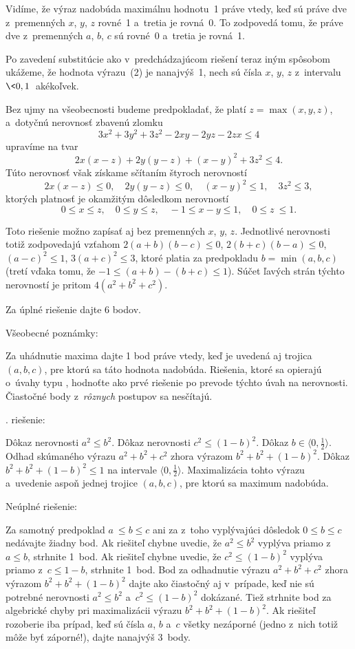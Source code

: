 {Vidíme, že výraz nadobúda maximálnu hodnotu~1
práve vtedy, keď sú práve dve z~premenných $x$, $y$, $z$ rovné~1
a~tretia je rovná~0. To zodpovedá tomu, že práve dve z~premenných $a$, $b$, $c$
sú rovné~0 a~tretia je rovná~1.

\ineres
Po zavedení substitúcie ako v~predchádzajúcom riešení teraz iným
spôsobom ukážeme, že hodnota výrazu~(2) je nanajvýš~1, nech sú čísla
$x$, $y$, $z$ z~intervalu $\<0,1\>$ akékoľvek.

Bez ujmy na všeobecnosti budeme predpokladať, že platí $z=\max(x,y,z)$,
a~dotyčnú nerovnosť zbavenú zlomku
$$
3x^2+3y^2+3z^2-2xy-2yz-2zx\le4
$$
upravíme na tvar
$$
2x(x-z)+2y(y-z)+(x-y)^2+3z^2\le4.
$$
Túto nerovnosť však získame sčítaním štyroch nerovností
$$
2x(x-z)\le0,\quad 2y(y-z)\le0,\quad (x-y)^2\le1,\quad 3z^2\le3,
$$
ktorých platnosť je okamžitým dôsledkom nerovností
$$
0\le x\le z,\quad 0\le y\le z,\quad -1\le x-y\le 1, \quad 0\le z~\le1.
$$

\poznamka
Toto riešenie možno zapísať aj bez premenných $x$, $y$, $z$.
Jednotlivé nerovnosti totiž zodpovedajú vzťahom
$2(a+b)(b-c)\le0$,
$2(b+c)(b-a)\le0$,
$(a-c)^2 \le1$,
$3(a+c)^2 \le3$,
ktoré platia za predpokladu $b=\min(a,b,c)$ (tretí vďaka tomu, že ${-1}\le (a+b)-(b+c)\le 1$).
Súčet ľavých strán týchto nerovností je pritom $4(a^2+b^2+c^2)$.

\nobreak\medskip\petit
\BeginSchema

Za úplné riešenie dajte 6 bodov.

\Podnadpis Všeobecné poznámky:

\Item Za uhádnutie maxima dajte 1 bod práve vtedy, keď je
uvedená aj trojica $(a, b, c)$, pre ktorú sa táto hodnota nadobúda.
\Item Riešenia, ktoré sa opierajú o~úvahy typu , hodnoťte ako prvé
riešenie po prevode týchto úvah na nerovnosti.
\Item Čiastočné body z~{\it rôznych\/} postupov sa nesčítajú.

. riešenie:

 Dôkaz nerovnosti $a^2 \le b^2$.
 Dôkaz nerovnosti $c^2 \le (1-b)^2$.
 Dôkaz $b \in \langle 0, \frac12 \rangle$.
 Odhad skúmaného výrazu $a^2+b^2+c^2$ zhora výrazom $b^2+b^2+(1-b)^2$.
 Dôkaz $b^2+b^2+(1-b)^2 \leq 1$ na intervale $\langle 0,\frac12 \rangle$.
 Maximalizácia tohto výrazu a~uvedenie aspoň jednej
trojice $(a, b, c)$, pre ktorú sa maximum nadobúda.

\Podnadpis Neúplné riešenie:

\Item Za samotný predpoklad $a~\le b \le c$ ani za z~toho vyplývajúci dôsledok $0\le b\le c$
nedávajte žiadny bod.
\Item Ak riešiteľ chybne uvedie, že $a^2 \le b^2$ vyplýva priamo z~$a\le b$, strhnite 1~bod.
\Item Ak riešiteľ chybne uvedie, že $c^2 \le (1-b)^2$ vyplýva priamo z~$c\leq 1-b$, strhnite 1~bod.
\Item Bod za odhadnutie výrazu $a^2+b^2+c^2$ zhora výrazom
$b^2+b^2+(1-b)^2$ dajte ako čiastočný aj v~prípade, keď nie sú
potrebné nerovnosti $a^2 \leq b^2$ a~$c^2 \le (1-b)^2$ dokázané.
\Item Tiež strhnite bod za algebrické chyby pri maximalizácii výrazu $b^2+b^2+(1-b)^2$.
\Item Ak riešiteľ rozoberie iba prípad, keď sú čísla $a$, $b$ a~$c$
všetky nezáporné (jedno z~nich totiž môže byť záporné!), dajte nanajvýš 3~body.

}
